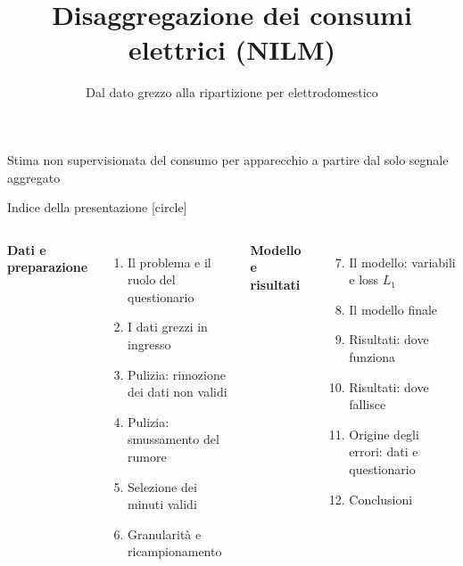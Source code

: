 \documentclass[aspectratio=169]{beamer}
\title[Disaggregazione NILM]{Disaggregazione dei consumi elettrici (NILM)}
\subtitle{Dal dato grezzo alla ripartizione per elettrodomestico}
\author{}
\date{}
\begin{document}
\begin{frame}[plain]
  \titlepage
  \begin{center}
    \small\color{CorpGray}
    Stima non supervisionata del consumo per apparecchio a partire dal solo segnale aggregato
  \end{center}
\end{frame}

\begin{frame}{Indice della presentazione}
  [circle]
  \begin{columns}[T]
    \textbf{\color{CorpBlue}Dati e preparazione}
    \begin{enumerate}
      \item Il problema e il ruolo del questionario
      \item I dati grezzi in ingresso
      \item Pulizia: rimozione dei dati non validi
      \item Pulizia: smussamento del rumore
      \item Selezione dei minuti validi
      \item Granularit\`a e ricampionamento
    \end{enumerate}
    \textbf{\color{CorpBlue}Modello e risultati}
    \begin{enumerate}\setcounter{enumi}{6}
      \item Il modello: variabili e loss $L_1$
      \item Il modello finale
      \item Risultati: dove funziona
      \item Risultati: dove fallisce
      \item Origine degli errori: dati e questionario
      \item Conclusioni
    \end{enumerate}
  \end{columns}
\end{frame}
\end{document}
